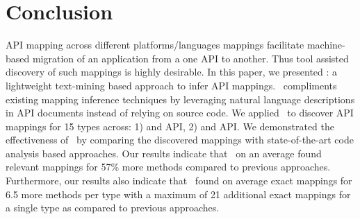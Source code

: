 \section{Conclusion}
\label{sec:conclusion}




API mapping across different platforms/languages mappings facilitate machine-based migration
of an application from a one API to another.
Thus tool assisted discovery of such mappings is highly desirable.
In this paper, we presented \tool : a lightweight text-mining based approach
to infer API mappings.
\tool\ compliments existing mapping inference techniques by leveraging natural language descriptions in API documents instead of relying on source code.
We applied \tool\ to discover API mappings for 15 types across: 
1)  and  API,
2)  and  API.
We demonstrated the effectiveness of \tool\ by 
comparing the discovered mappings with state-of-the-art code analysis based approaches.
Our results indicate that \tool\ on an average found relevant mappings for 57\% more methods compared to previous approaches. 
Furthermore, our results also indicate that \tool\ found on average exact mappings for 6.5 more methods per type with a maximum of 21 additional exact mappings for a single type as compared to previous approaches.